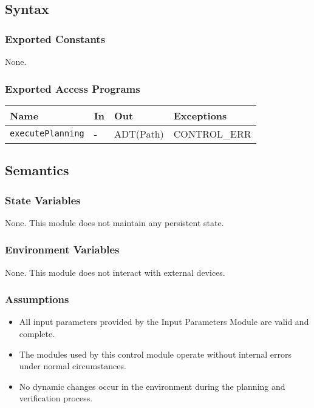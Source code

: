 \documentclass[12pt, titlepage]{article}
\begin{document}
\subsection{Syntax}

\subsubsection{Exported Constants}

None.

\subsubsection{Exported Access Programs}

\begin{center}
\renewcommand{\arraystretch}{1.4}
\begin{tabular}{p{3.5cm} p{5cm} p{3cm} p{3cm}}
\toprule
\textbf{Name} & \textbf{In} & \textbf{Out} & \textbf{Exceptions} \\
\midrule
\texttt{executePlanning} & - & ADT(Path) & CONTROL\_ERR \\[4pt]
\bottomrule
\end{tabular}
\end{center}

\subsection{Semantics}

\subsubsection{State Variables}

None. This module does not maintain any persistent state.

\subsubsection{Environment Variables}

None. This module does not interact with external devices.

\subsubsection{Assumptions}

\begin{itemize}
    \item All input parameters provided by the Input Parameters Module are valid and complete.
    \item The modules used by this control module operate without internal errors under normal circumstances.
    \item No dynamic changes occur in the environment during the planning and verification process.
\end{itemize}
\end{document}
